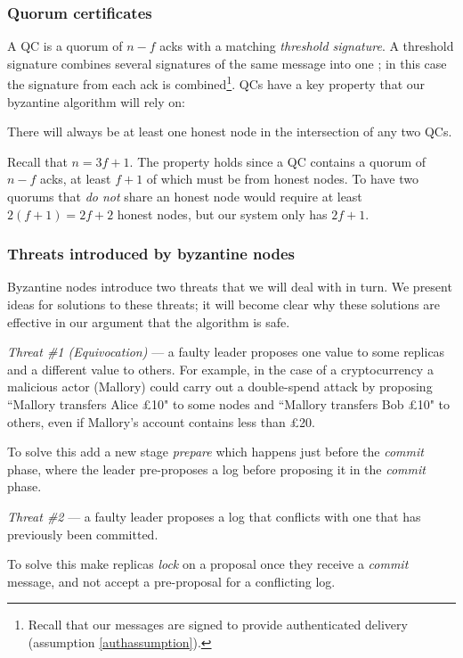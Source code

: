 \subsubsection{Quorum certificates}

A QC is a quorum of $n - f$ acks with a matching \textit{threshold signature}. A threshold signature combines several signatures of the same message into one \cite{shoupPracticalThresholdSignatures2000, cachinRandomOraclesConstantinople2005}; in this case the signature from each ack is combined\footnote{Recall that our messages are signed to provide authenticated delivery (assumption \ref{authassumption}).}. QCs have a key property that our byzantine algorithm will rely on:

\begin{property} \label{qcproperty}
There will always be at least one honest node in the intersection of any two QCs.
\end{property}

Recall that $n = 3f + 1$. The property holds since a QC contains a quorum of $n - f$ acks, at least $f + 1$ of which must be from honest nodes. To have two quorums that \textit{do not} share an honest node would require at least $2(f + 1) = 2f + 2$ honest nodes, but our system only has $2f + 1$.

\subsubsection{Threats introduced by byzantine nodes}
Byzantine nodes introduce two threats that we will deal with in turn. We present ideas for solutions to these threats; it will become clear why these solutions are effective in our argument that the algorithm is safe.

\begin{description}
\item \textit{Threat \#1 (Equivocation)} --- a faulty leader proposes one value to some replicas and a different value to others. For example, in the case of a cryptocurrency a malicious actor (Mallory) could carry out a double-spend attack by proposing ``Mallory transfers Alice £10" to some nodes and ``Mallory transfers Bob £10" to others, even if Mallory's account contains less than £20. \label{threat1}

To solve this add a new stage \textit{prepare} which happens just before the \textit{commit} phase, where the leader pre-proposes a log before proposing it in the \textit{commit} phase.

\item \textit{Threat \#2} --- a faulty leader proposes a log that conflicts with one that has previously been committed. \label{threat2}

To solve this make replicas \textit{lock} on a proposal once they receive a \textit{commit} message, and not accept a pre-proposal for a conflicting log.
\end{description}


